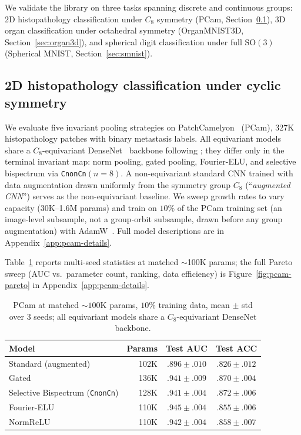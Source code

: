 \documentclass{article}
\theoremstyle{definition}
\theoremstyle{remark}
\newcommand{\SO}{\mathrm{SO}}
\theoremstyle{definition}
\begin{document}
We validate the library on three tasks spanning discrete and continuous
groups: 2D histopathology classification under $C_8$ symmetry (PCam,
Section~\ref{sec:pcam}), 3D organ classification under octahedral symmetry
(OrganMNIST3D, Section~\ref{sec:organ3d}), and spherical digit
classification under full $\SO(3)$ (Spherical MNIST,
Section~\ref{sec:smnist}).

\subsection{2D histopathology classification under cyclic symmetry}
\label{sec:pcam}

We evaluate five invariant pooling strategies on
PatchCamelyon~\citep{veeling2018rotation} (PCam), 327K histopathology
patches with binary metastasis labels. All equivariant models share a
$C_8$-equivariant DenseNet~\citep{huang2017densenet} backbone following
\citet{veeling2018rotation}; they differ only in the terminal invariant map:
norm pooling, gated pooling, Fourier-ELU, and selective bispectrum via
\texttt{CnonCn}$(n{=}8)$. A non-equivariant standard CNN trained with
data augmentation drawn uniformly from the symmetry group $C_8$
(``\emph{augmented CNN}'') serves as the non-equivariant baseline. We
sweep growth rates to vary capacity (30K--1.6M params) and train on
$10\%$ of the PCam training set (an image-level subsample, not a
group-orbit subsample, drawn before any group augmentation) with
AdamW~\citep{loshchilov2019adamw}. Full model descriptions are in
Appendix~\ref{app:pcam-details}.

Table~\ref{tab:pcam-results} reports multi-seed statistics at
matched $\sim$100K params; the full Pareto sweep (AUC vs.\
parameter count, ranking, data efficiency) is
Figure~\ref{fig:pcam-pareto} in Appendix~\ref{app:pcam-details}.

\begin{table}[t]
  \caption{PCam at matched ${\sim}100$K params, $10\%$ training
    data, mean $\pm$ std over 3 seeds; all equivariant models share
    a $C_8$-equivariant DenseNet backbone.}
  \label{tab:pcam-results}
  \centering
  \small
  \begin{tabular}{lrcc}
    \toprule
    Model & Params & Test AUC & Test ACC \\
    \midrule
    Standard (augmented)          & 102K & $.896 \pm .010$ & $.826 \pm .012$ \\
    Gated                         & 136K & $.941 \pm .009$ & $.870 \pm .004$ \\
    Selective Bispectrum (\texttt{CnonCn})  & 128K & $.941 \pm .004$ & $\mathbf{.872 \pm .006}$ \\
    Fourier-ELU                   & 110K & $\mathbf{.945 \pm .004}$ & $.855 \pm .006$ \\
    NormReLU                      & 110K & $.942 \pm .004$ & $.858 \pm .007$ \\
    \bottomrule
  \end{tabular}
\end{table}
\end{document}
